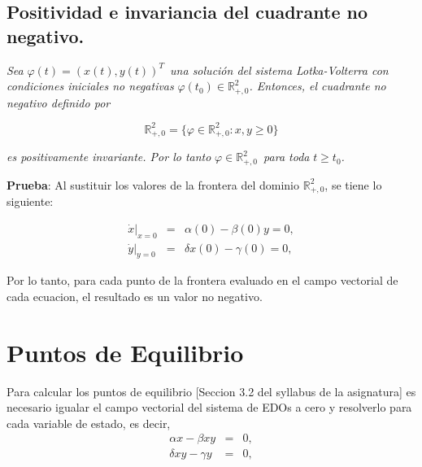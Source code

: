 \documentclass[letterpaper,11pt]{article}
\begin{document}
\bigskip

\subsection{Positividad e invariancia del cuadrante no negativo.}

\textit{Sea }$\varphi (t)=(x(t),y(t))^{T}$\textit{\ una soluci\'{o}n del
sistema Lotka-Volterra con condiciones iniciales no negativas }$\varphi
(t_{0})\in 
\mathbb{R}
_{+,0}^{2}$\textit{. Entonces, el cuadrante no negativo definido por }

\begin{equation*}
\mathbb{R}
_{+,0}^{2}=\{\varphi \in 
\mathbb{R}
_{+,0}^{2}:x,y\geq 0\}
\end{equation*}

\textit{es positivamente invariante. Por lo tanto }$\varphi \in 
\mathbb{R}
_{+,0}^{2}$\textit{\ para toda }$t\geq t_{0}$\textit{.}

\bigskip

\textbf{Prueba}: Al sustituir los valores de la frontera del dominio $%
\mathbb{R}
_{+,0}^{2}$, se tiene lo siguiente:

\begin{eqnarray*}
\left. \dot{x}\right\vert _{x=0} &=&\alpha (0)-\beta (0)y=0, \\
\left. \dot{y}\right\vert _{y=0} &=&\delta x(0)-\gamma (0)=0,
\end{eqnarray*}

Por lo tanto, para cada punto de la frontera evaluado en el campo vectorial
de cada ecuacion, el resultado es un valor no negativo.

\bigskip

\section{Puntos de Equilibrio}

Para calcular los puntos de equilibrio [Seccion 3.2 del syllabus de la
asignatura] es necesario igualar el campo vectorial del sistema de EDOs a
cero y resolverlo para cada variable de estado, es decir,\newline
\begin{eqnarray*}
\alpha x-\beta xy &=&0, \\
\delta xy-\gamma y &=&0,
\end{eqnarray*}
\end{document}
